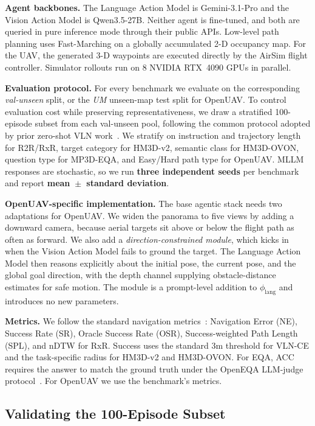 \documentclass[conference]{IEEEtran}
\begin{document}
\textbf{Agent backbones.} The Language Action Model is Gemini-3.1-Pro and the
Vision Action Model is Qwen3.5-27B. Neither agent is fine-tuned, and both are
queried in pure inference mode through their public APIs. Low-level path
planning uses Fast-Marching on a globally accumulated 2-D occupancy map. For
the UAV, the generated 3-D waypoints are executed directly by the AirSim
flight controller. Simulator rollouts run on 8 NVIDIA RTX~4090 GPUs in
parallel.

\textbf{Evaluation protocol.} For every benchmark we evaluate on the
corresponding \emph{val-unseen} split, or the \emph{UM} unseen-map test split
for OpenUAV. To control evaluation cost while preserving representativeness,
we draw a stratified 100-episode subset from each val-unseen pool, following
the common protocol adopted by prior zero-shot VLN
work~\cite{qiao2024opennav,zhang2024navid}. We stratify on instruction and
trajectory length for R2R/RxR, target category for HM3D-v2, semantic class for
HM3D-OVON, question type for MP3D-EQA, and Easy/Hard path type for OpenUAV.
MLLM responses are stochastic, so we run \textbf{three independent seeds} per
benchmark and report \textbf{mean~$\pm$~standard deviation}.

\textbf{OpenUAV-specific implementation.} The base agentic stack needs two
adaptations for OpenUAV. We widen the panorama to five views by adding a
downward camera, because aerial targets sit above or below the flight path as
often as forward. We also add a \emph{direction-constrained module}, which
kicks in when the Vision Action Model fails to ground the target. The Language
Action Model then reasons explicitly about the initial pose, the current pose,
and the global goal direction, with the depth channel supplying
obstacle-distance estimates for safe motion. The module is a prompt-level
addition to $\phi_{\mathrm{lang}}$ and introduces no new parameters.

\textbf{Metrics.} We follow the standard navigation
metrics~\cite{anderson2018vision}: Navigation Error (NE), Success
Rate (SR), Oracle Success Rate (OSR), Success-weighted Path Length (SPL),
and nDTW for RxR. Success uses the standard 3m threshold for VLN-CE and
the task-specific radius for HM3D-v2 and HM3D-OVON. For EQA, ACC requires the
answer to match the ground truth under the OpenEQA LLM-judge
protocol~\cite{majumdar2024openeqa}. For OpenUAV we use the benchmark's
metrics.

\subsection{Validating the 100-Episode Subset}
\label{subsec:subset_validity}
\end{document}
